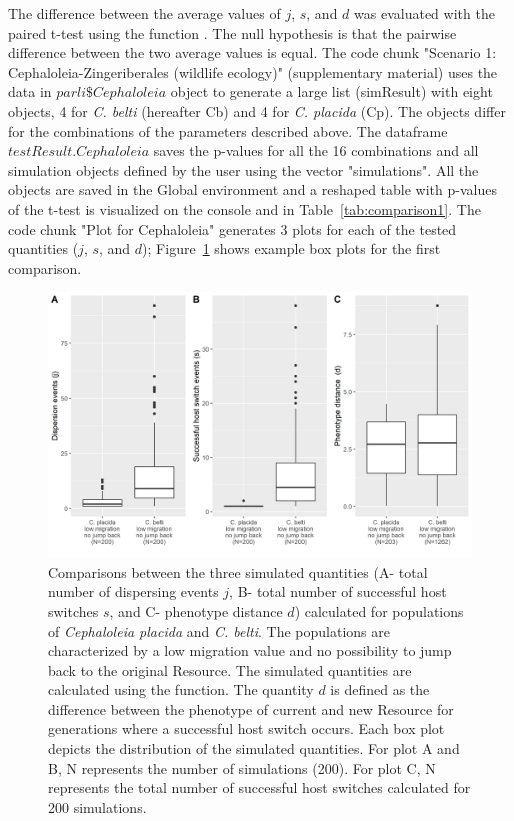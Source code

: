 The difference between the average values of $j$, $s$, and $d$ was evaluated with the paired t-test using the function . The null hypothesis is that the pairwise difference between the two average values is equal.
The code chunk "Scenario 1: Cephaloleia-Zingeriberales (wildlife ecology)" (supplementary material) uses the data in $parli\$Cephaloleia$ object to generate a large list (simResult) with eight  objects, 4 for \textit{C. belti} (hereafter Cb) and 4 for \textit{C. placida} (Cp). The objects differ for the combinations of the parameters described above. The dataframe $testResult.Cephaloleia$ saves the p-values for all the 16 combinations and all simulation objects defined by the user using the vector "simulations". All the objects are saved in the Global environment and a reshaped table with p-values of the t-test is visualized on the console and in Table~\ref{tab:comparison1}.
The code chunk "Plot for Cephaloleia" generates 3 plots for each of the tested quantities ($j$, $s$, and $d$); Figure~\ref{figure:Boxplots1} shows example box plots for the first comparison.

\begin{figure}[htbp]
  \centering
  \includegraphics[width=120mm,scale=0.7]{figure 1usage.png}
  \caption{Comparisons between the three simulated quantities (A- total number of dispersing events $j$, B- total number of successful host switches $s$, and C- phenotype distance $d$) calculated for populations of \textit{Cephaloleia placida} and \textit{C. belti}. The populations are characterized by a low migration value and no possibility to jump back to the original Resource. The simulated quantities are calculated using the  function. The quantity $d$ is defined as the difference between the phenotype of current and new Resource for generations where a successful host switch occurs. Each box plot depicts the distribution of the simulated quantities. For plot A and B, N represents the number of simulations (200). For plot C, N represents the total number of successful host switches calculated for 200 simulations.}
  \label{figure:Boxplots1}
\end{figure}

